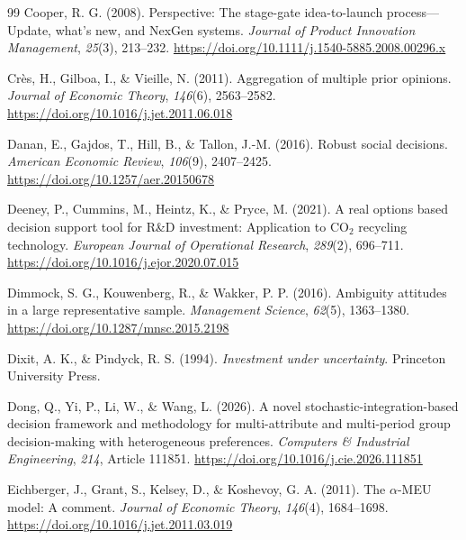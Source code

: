 \begin{thebibliography}{99}
Cooper, R. G. (2008). Perspective: The stage-gate idea-to-launch process---Update, what's new, and NexGen systems. \emph{Journal of Product Innovation Management}, \emph{25}(3), 213--232. \url{https://doi.org/10.1111/j.1540-5885.2008.00296.x}

Cr\`es, H., Gilboa, I., \& Vieille, N. (2011). Aggregation of multiple prior opinions. \emph{Journal of Economic Theory}, \emph{146}(6), 2563--2582. \url{https://doi.org/10.1016/j.jet.2011.06.018}

Danan, E., Gajdos, T., Hill, B., \& Tallon, J.-M. (2016). Robust social decisions. \emph{American Economic Review}, \emph{106}(9), 2407--2425. \url{https://doi.org/10.1257/aer.20150678}

Deeney, P., Cummins, M., Heintz, K., \& Pryce, M. (2021). A real options based decision support tool for R\&D investment: Application to CO$_2$ recycling technology. \emph{European Journal of Operational Research}, \emph{289}(2), 696--711. \url{https://doi.org/10.1016/j.ejor.2020.07.015}

Dimmock, S. G., Kouwenberg, R., \& Wakker, P. P. (2016). Ambiguity attitudes in a large representative sample. \emph{Management Science}, \emph{62}(5), 1363--1380. \url{https://doi.org/10.1287/mnsc.2015.2198}

Dixit, A. K., \& Pindyck, R. S. (1994). \emph{Investment under uncertainty}. Princeton University Press.

Dong, Q., Yi, P., Li, W., \& Wang, L. (2026). A novel stochastic-integration-based decision framework and methodology for multi-attribute and multi-period group decision-making with heterogeneous preferences. \emph{Computers \& Industrial Engineering}, \emph{214}, Article 111851. \url{https://doi.org/10.1016/j.cie.2026.111851}

Eichberger, J., Grant, S., Kelsey, D., \& Koshevoy, G. A. (2011). The $\alpha$-MEU model: A comment. \emph{Journal of Economic Theory}, \emph{146}(4), 1684--1698. \url{https://doi.org/10.1016/j.jet.2011.03.019}


\end{thebibliography}
